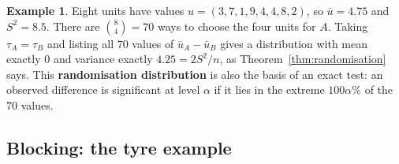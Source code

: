 \documentclass[11pt,a4paper]{article}
\numberwithin{equation}{section}
\theoremstyle{definition}
\newtheorem{exa}[thm]{Example}
\begin{document}
\begin{exa}\label{exa:randomisation-dist}
Eight units have values $u = (3, 7, 1, 9, 4, 4, 8, 2)$, so $\bar u = 4.75$ and $S^2 = 8.5$. There are $\binom84 = 70$ ways to choose the four units
for $A$. Taking $\tau_A = \tau_B$ and listing all $70$ values of $\bar u_A - \bar u_B$ gives a distribution with mean exactly $0$ and variance
exactly $4.25 = 2S^2/n$, as Theorem~\ref{thm:randomisation} says. This \textbf{randomisation distribution} is also the basis of an exact test: an
observed difference is significant at level $\alpha$ if it lies in the extreme $100\alpha\%$ of the $70$ values.
\end{exa}

\subsection{Blocking: the tyre example}
\end{document}
